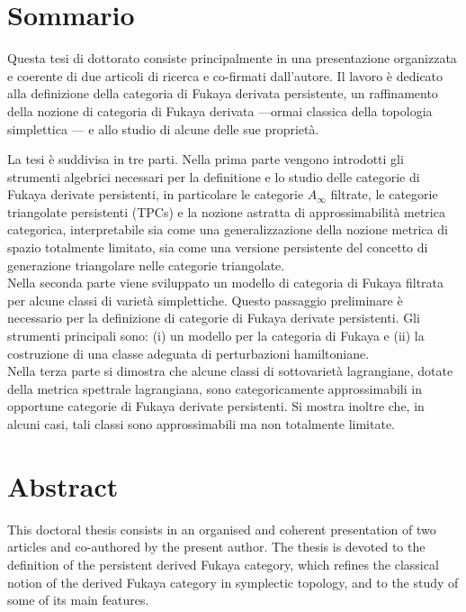 \chapter*{Sommario}
Questa tesi di dottorato consiste principalmente in una presentazione organizzata e coerente di due articoli di ricerca \cite{Amb:fil-fuk} e \cite{ABC26} co-firmati dall'autore. Il lavoro è dedicato alla definizione della categoria di Fukaya derivata persistente, un raffinamento della nozione di categoria di Fukaya derivata —ormai classica della topologia simplettica — e allo studio di alcune delle sue proprietà.

La tesi è suddivisa in tre parti. Nella prima parte vengono introdotti gli strumenti algebrici necessari per la definitione e lo studio delle categorie di Fukaya derivate persistenti, in particolare le categorie $A_\infty$ filtrate, le categorie triangolate persistenti (TPCs) e la nozione astratta di approssimabilità metrica categorica, interpretabile sia come una generalizzazione della nozione metrica di spazio totalmente limitato, sia come una versione persistente del concetto di generazione triangolare nelle categorie triangolate.\\
Nella seconda parte viene sviluppato un modello di categoria di Fukaya filtrata per alcune classi di varietà simplettiche. Questo passaggio preliminare è necessario per la definizione di categorie di Fukaya derivate persistenti. Gli strumenti principali sono: (i) un modello  per la categoria di Fukaya e (ii) la costruzione di una classe adeguata di perturbazioni hamiltoniane.\\
Nella terza parte si dimostra che alcune classi di sottovarietà lagrangiane, dotate della metrica spettrale lagrangiana, sono categoricamente approssimabili in opportune categorie di Fukaya derivate persistenti. Si mostra inoltre che, in alcuni casi, tali classi sono approssimabili ma non totalmente limitate.

\chapter*{Abstract}

This doctoral thesis consists in an organised and coherent presentation of two articles \cite{Amb:fil-fuk} and \cite{ABC26} co-authored by the present author. The thesis is devoted to the definition of the persistent derived Fukaya category, which refines the classical notion of the derived Fukaya category in symplectic topology, and to the study of some of its main features.

